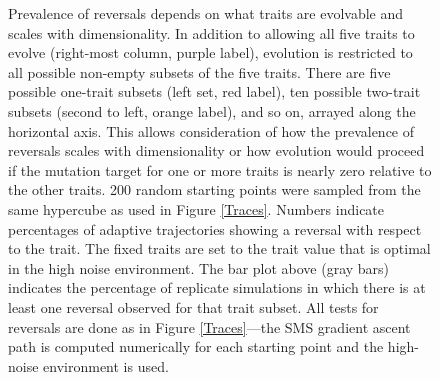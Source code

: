 \documentclass[dvips,12pt,twoside,titlepage]{article}
\begin{document}
\begin{figure}
\begin{center}
\caption{Prevalence of reversals depends on what traits are evolvable and scales with dimensionality. 
In addition to allowing all five traits to evolve (right-most column, purple label), evolution is restricted to all possible non-empty subsets of the five traits. 
There are five possible one-trait subsets (left set, red label), ten possible two-trait subsets (second to left, orange label), and so on, arrayed along the horizontal axis. 
This allows consideration of how the prevalence of reversals scales with dimensionality or how evolution would proceed if the mutation target for one or more traits is nearly zero relative to the other traits. 
200 random starting points were sampled from the same hypercube as used in Figure \ref{Traces}. Numbers indicate percentages of adaptive trajectories showing a reversal with respect to the trait.
The fixed traits are set to the trait value that is optimal in the high noise environment. 
The bar plot above (gray bars) indicates the percentage of replicate simulations in which there is at least one reversal observed for that trait subset.
All tests for reversals are done as in Figure \ref{Traces}---the SMS gradient ascent path is computed numerically for each starting point and the high-noise environment is used.
}
\label{Dimension}
\end{center}
\end{figure}
\clearpage


\end{document}
